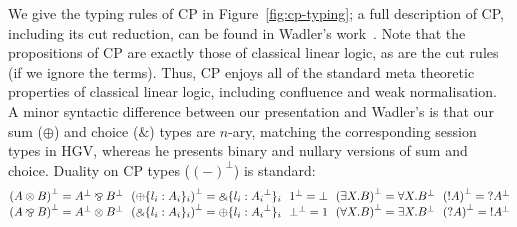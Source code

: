 \documentclass{easychair}
\makeatletter
\newcommand{\ba}{\begin{array}}
\newcommand{\ea}{\end{array}}
\newcommand{\bl}{\ba{@{}c@{}}}
\newcommand{\el}{\ea}
\newcommand{\set}[1]{\{ #1 \}}
\newcommand{\row}[2]{\set{#1}_{#2}}
\newcommand{\la}{l}
\newcommand{\cpTimes}[2]{{#1} \otimes {#2}}
\newcommand{\cpPar}[2]{{#1} \mathbin{\bindnasrepma} {#2}}
\newcommand{\cpPlus}[2]{\oplus \row{#1}{#2}}
\newcommand{\cpWith}[2]{\binampersand \row{#1}{#2}}
\newcommand{\cpOne}{1}
\newcommand{\cpBottom}{\bot}
\newcommand{\cpOfCourse}[1]{\mathord{!}{#1}}
\newcommand{\cpWhyNot}[1]{\mathord{?}{#1}}
\newcommand{\cpDual}[1]{{#1}^\bot}
\newcommand{\cpExists}[2]{\exists {#1}.{#2}}
\newcommand{\cpForall}[2]{\forall {#1}.{#2}}
\newcommand{\hgv}{HGV\xspace}
\makeatother
\begin{document}
We give the typing rules of CP in Figure~\ref{fig:cp-typing}; a full description of CP, including
its cut reduction, can be found in Wadler's work~\cite{Wadler12}.  Note that the propositions of CP
are exactly those of classical linear logic, as are the cut rules (if we ignore the terms). Thus, CP
enjoys all of the standard meta theoretic properties of classical linear logic, including confluence
and weak normalisation.
%
A minor syntactic difference between our presentation and Wadler's is that our sum ($\oplus$) and
choice ($\binampersand$) types are $n$-ary, matching the corresponding session types in \hgv,
whereas he presents binary and nullary versions of sum and choice.
%
Duality on CP types ($\cpDual{(-)}$) is standard:
\[
\bl
  \cpDual{(\cpTimes{A}{B})} = \cpPar{\cpDual{A}}{\cpDual{B}}
~~
  \cpDual{(\cpPlus{\la_i:A_i}{i})} = \cpWith{\la_i:\cpDual{A_i}}{i}
~~
  \cpDual{\cpOne} = \cpBottom
~~
  \cpDual{(\cpExists{X}{B})} = \cpForall{X}{\cpDual{B}}
~~
  \cpDual{(\cpOfCourse{A})} = \cpWhyNot{\cpDual{A}}
\\
  \cpDual{(\cpPar{A}{B})} = \cpTimes{\cpDual{A}}{\cpDual{B}}
~~
  \cpDual{(\cpWith{\la_i:A_i}{i})} = \cpPlus{\la_i:\cpDual{A_i}}{i}
~~
  \cpDual{\cpBottom} = \cpOne
~~
  \cpDual{(\cpForall{X}{B})} = \cpExists{X}{\cpDual{B}}
~~
  \cpDual{(\cpWhyNot{A})} = \cpOfCourse{\cpDual{A}}
\\
\el
\]
\end{document}
